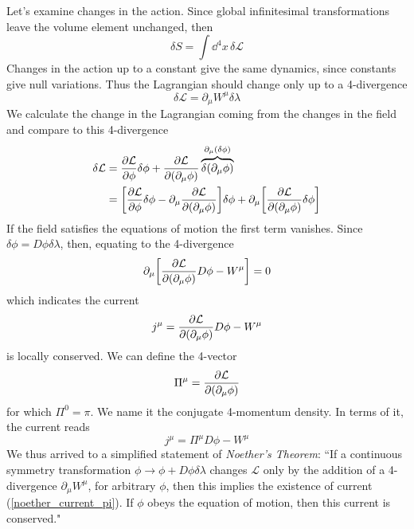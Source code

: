Let's examine changes in the action. Since global infinitesimal transformations leave the volume element unchanged, then
\begin{equation}
    \delta S=\int\dd^4x\, \delta\mathcal{L}
\end{equation}
Changes in the action up to a constant give the same dynamics, since constants give null variations. Thus the Lagrangian should change only up to a 4-divergence 
\begin{equation}
    \delta \mathcal{L}=\partial_\mu W^\mu\delta\lambda
    \label{lag_4div}
\end{equation}
We calculate the change in the Lagrangian coming from the changes in the field and compare to this 4-divergence
\begin{equation}
\begin{aligned}
    \delta \mathcal{L}&=\pdv{\mathcal{L}}{\phi}\delta\phi+\pdv{\mathcal{L}}{(\partial_\mu\phi)}\overbrace{\delta(\partial_\mu\phi)}^{\partial_\mu(\delta\phi)}\\
    &=\qty[\pdv{\mathcal{L}}{\phi}\delta\phi-\partial_\mu\pdv{\mathcal{L}}{(\partial_\mu\phi)}]\delta\phi+\partial_\mu\qty[\pdv{\mathcal{L}}{(\partial_\mu\phi)}\delta\phi]
\end{aligned}
\end{equation}
If the field satisfies the equations of motion  the first term vanishes. Since $\delta\phi=D\phi\delta \lambda$, then, equating to the 4-divergence
\begin{equation}
    \partial_\mu\qty[\pdv{\mathcal{L}}{(\partial_\mu\phi)}D\phi-W^\mu]=0
\end{equation}
which indicates the current 
\begin{equation}
    j^\mu=\pdv{\mathcal{L}}{(\partial_\mu\phi)}D\phi-W^\mu
    \label{noether_current}
\end{equation}
is locally conserved. We can define the 4-vector
\begin{equation}
    \Pi^\mu=\pdv{\mathcal{L}}{(\partial_\mu\phi)}
\end{equation}
for which $\Pi^0=\pi$. We name it the conjugate 4-momentum density. In terms of it, the current reads
\begin{equation}
    j^\mu=\Pi^\mu D\phi-W^\mu
    \label{noether_current_pi}
\end{equation}
We thus arrived to a simplified statement of \textit{Noether's Theorem}: ``If a continuous symmetry transformation $\phi\to\phi+D\phi\delta \lambda$ changes $\mathcal{L}$ only by the addition of a 4-divergence $\partial_\mu W^\mu$, for arbitrary $\phi$, then this implies the existence of current (\ref{noether_current_pi}). If $\phi$ obeys the equation of motion, then this current is conserved." \cite{lancaster2014quantum}
